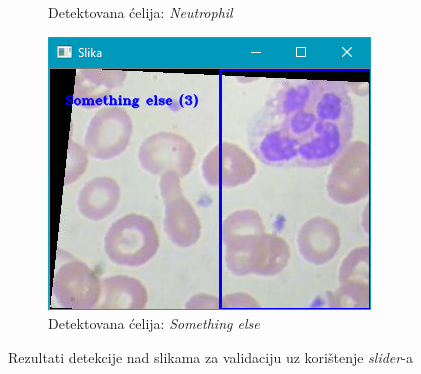 \documentclass[12pt,a4paper]{article}
\begin{document}
\begin{figure}[H]
\begin{subfigure}{.5\textwidth}
  \caption{Detektovana ćelija: \textit{Neutrophil}}
\end{subfigure}
\begin{subfigure}{.5\textwidth}
  \centering
  \includegraphics[scale=.9]{slikaSlider4.png}
  \caption{Detektovana ćelija: \textit{Something else}}
\end{subfigure}
\caption{Rezultati detekcije nad slikama za validaciju uz korištenje \textit{slider}-a}
\end{figure}
\end{document}
